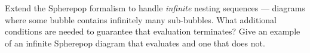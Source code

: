 \begin{exercise}[title={Extension}]
  Extend the Spherepop formalism to handle \emph{infinite} nesting
  sequences — diagrams where some bubble contains infinitely many
  sub-bubbles. What additional conditions are needed to guarantee
  that evaluation terminates? Give an example of an infinite Spherepop
  diagram that evaluates and one that does not.
\end{exercise}
